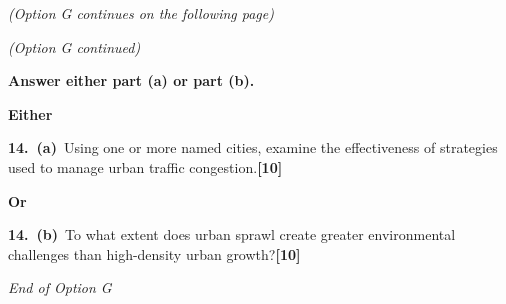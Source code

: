 \documentclass[11pt,a4paper]{article}
\newcommand{\markpts}[1]{\hfill\textbf{[#1]}}
\newcommand{\exam}[1]{#1}
\begin{document}
\vspace{0.6em}
\textit{(Option G continues on the following page)}

\newpage

\textit{(Option G continued)}

\textbf{Answer either part (a) or part (b).}

\medskip
\noindent\textbf{Either}

\medskip
\noindent\textbf{14.\ (a)}~Using one or more named cities, \exam{examine} the
effectiveness of strategies used to manage urban traffic
congestion.\markpts{10}

\medskip
\noindent\textbf{Or}

\medskip
\noindent\textbf{14.\ (b)}~\exam{To what extent} does urban sprawl create greater
environmental challenges than high-density urban growth?\markpts{10}

\vspace{0.8em}
\textit{End of Option G}
\end{document}
